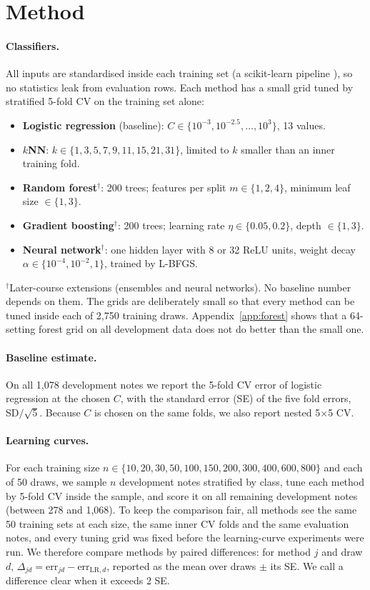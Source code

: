 \section{Method}
\label{sec:method}
\paragraph{Classifiers.} All inputs are standardised inside each training set (a scikit-learn pipeline \cite{pedregosa2011scikit}), so no statistics leak from evaluation rows. Each method has a small grid tuned by stratified 5-fold CV on the training set alone:
\begin{itemize}
  \item \textbf{Logistic regression} (baseline): $C\in\{10^{-3},10^{-2.5},\dots,10^{3}\}$, 13 values.
  \item \textbf{$k$NN}: $k\in\{1,3,5,7,9,11,15,21,31\}$, limited to $k$ smaller than an inner training fold.
  \item \textbf{Random forest}$^\dagger$: 200 trees; features per split $m\in\{1,2,4\}$, minimum leaf size $\in\{1,3\}$.
  \item \textbf{Gradient boosting}$^\dagger$: 200 trees; learning rate $\eta\in\{0.05,0.2\}$, depth $\in\{1,3\}$.
  \item \textbf{Neural network}$^\dagger$: one hidden layer with 8 or 32 ReLU units, weight decay $\alpha\in\{10^{-4},10^{-2},1\}$, trained by L-BFGS.
\end{itemize}
$^\dagger$Later-course extensions (ensembles and neural networks). No baseline number depends on them. The grids are deliberately small so that every method can be tuned inside each of 2,750 training draws. Appendix~\ref{app:forest} shows that a 64-setting forest grid on all development data does not do better than the small one.

\paragraph{Baseline estimate.} On all 1,078 development notes we report the 5-fold CV error of logistic regression at the chosen $C$, with the standard error (SE) of the five fold errors, SD$/\sqrt{5}$. Because $C$ is chosen on the same folds, we also report nested 5$\times$5 CV.

\paragraph{Learning curves.} For each training size $n\in\{10,20,30,50,100,150,200,300,400,600,800\}$ and each of 50 draws, we sample $n$ development notes stratified by class, tune each method by 5-fold CV inside the sample, and score it on all remaining development notes (between 278 and 1,068). To keep the comparison fair, all methods see the same 50 training sets at each size, the same inner CV folds and the same evaluation notes, and every tuning grid was fixed before the learning-curve experiments were run. We therefore compare methods by paired differences: for method $j$ and draw $d$, $\Delta_{jd}=\text{err}_{jd}-\text{err}_{\text{LR},d}$, reported as the mean over draws $\pm$ its SE. We call a difference clear when it exceeds 2 SE.

